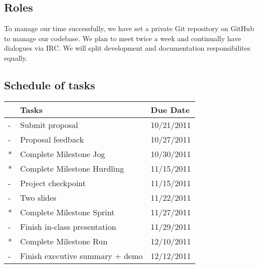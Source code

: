 \documentclass{article}
\begin{document}
\subsection{Roles}
To manage our time successfully, we have set a private Git repository on GitHub to manage our codebase. 
We plan to meet twice a week and continually have dialogues via IRC. We will split development and documentation
responsibilites equally.

\subsection{Schedule of tasks}
\begin{tabular}{|l|l|l|}
\hline
  & Tasks                             & Due Date   \\ \hline
- & Submit proposal                   & 10/21/2011 \\
- & Proposal feedback                 & 10/27/2011 \\
* & Complete Milestone Jog            & 10/30/2011 \\
* & Complete Milestone Hurdling       & 11/15/2011 \\
- & Project checkpoint                & 11/15/2011 \\
- & Two slides                        & 11/22/2011 \\
* & Complete Milestone Sprint         & 11/27/2011 \\
- & Finish in-class presentation      & 11/29/2011 \\
* & Complete Milestone Run            & 12/10/2011 \\
- & Finish executive summary + demo   & 12/12/2011 \\
\hline
\end{tabular}
\end{document}
